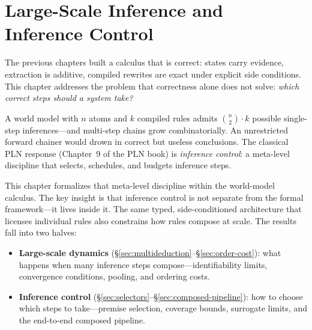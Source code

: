 \documentclass[11pt,openany]{report}
\begin{document}


\chapter{Large-Scale Inference and Inference Control}
\label{ch:scale-control}

The previous chapters built a calculus that is correct: states carry
evidence, extraction is additive, compiled rewrites are exact under
explicit side conditions.  This chapter addresses the problem that
correctness alone does not solve: \emph{which correct steps should a
system take?}

A world model with $n$ atoms and $k$ compiled rules admits
$\binom{n}{2} \cdot k$ possible single-step inferences---and
multi-step chains grow combinatorially.  An unrestricted forward
chainer would drown in correct but useless conclusions.  The
classical PLN response (Chapter~9 of the PLN book) is
\emph{inference control}: a meta-level discipline that selects,
schedules, and budgets inference steps.

This chapter formalizes that meta-level discipline within the
world-model calculus.  The key insight is that inference control is
not separate from the formal framework---it lives inside it.  The
same typed, side-conditioned architecture that licenses individual
rules also constrains how rules compose at scale.  The results fall
into two halves:

\begin{itemize}
\item \textbf{Large-scale dynamics} (\S\ref{sec:multideduction}--\S\ref{sec:order-cost}): what happens when
  many inference steps compose---identifiability limits,
  convergence conditions, pooling, and ordering costs.
\item \textbf{Inference control}
  (\S\ref{sec:selectors}--\S\ref{sec:composed-pipeline}): how to
  choose which steps to take---premise selection, coverage bounds,
  surrogate limits, and the end-to-end composed pipeline.
\end{itemize}
\end{document}
